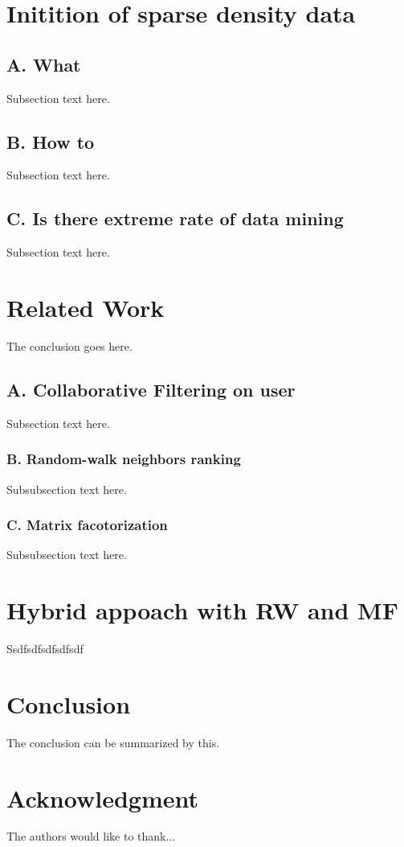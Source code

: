 \documentclass[conference]{IEEEtran}
\begin{document}
\section{Initition of sparse density data}
\subsection{A. What  }
Subsection text here.
\subsection{B. How to  }
Subsection text here.
\subsection{C. Is there extreme rate of data mining  }
Subsection text here.


\section{Related Work}
The conclusion goes here.
\subsection{A. Collaborative Filtering on user }
Subsection text here.

\subsubsection{B. Random-walk neighbors ranking}
Subsubsection text here.

\subsubsection{C. Matrix facotorization }
Subsubsection text here.

\section{Hybrid appoach with RW and MF}
Ssdfsdfsdfsdfsdf

\section{Conclusion}
 The conclusion can be summarized by this.

\section*{Acknowledgment}


The authors would like to thank...


\end{document}
